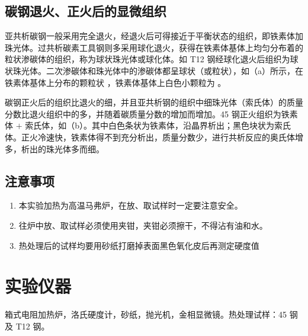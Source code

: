     \subsection{碳钢退火、正火后的显微组织}
        亚共析碳钢一般采用完全退火，经退火后可得接近于平衡状态的组织，即铁素体加珠光体。过共析碳素工具钢则多采用球化退火，获得在铁素体基体上均匀分布着的粒状渗碳体的组织，称为球状珠光体或球化体。如 T12 钢经球化退火后组织为球状珠光体。二次渗碳体和珠光体中的渗碳体都呈球状（或粒状），如（a）所示，在铁素体基体上分布的颗粒状 ，铁素体基体上白色小颗粒为 。\par
        碳钢正火后的组织比退火的细，并且亚共析钢的组织中细珠光体（索氏体）的质量分数比退火组织中的多，并随着碳质量分数的增加而增加。45 钢正火组织为铁素体 $+$ 索氏体，如（b）。其中白色条状为铁素体，沿晶界析出；黑色块状为索氏体。正火冷速快，铁素体得不到充分析出，质量分数少，进行共析反应的奥氏体增多，析出的珠光体多而细。
    \subsection{注意事项}
    \begin{enumerate}
        \item 本实验加热为高温马弗炉，在放、取试样时一定要注意安全。
        \item 往炉中放、取试样必须使用夹钳，夹钳必须擦干，不得沾有油和水。
        \item 热处理后的试样均要用砂纸打磨掉表面黑色氧化皮后再测定硬度值
    \end{enumerate}
\section{实验仪器}%
    箱式电阻加热炉，洛氏硬度计，砂纸，抛光机，金相显微镜。热处理试样：45 钢及 T12 钢。
